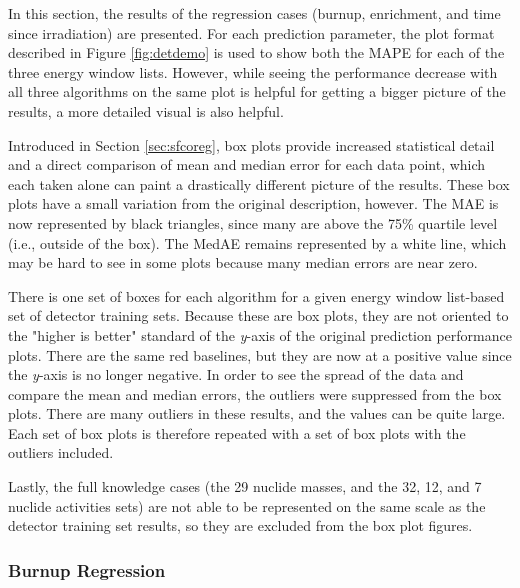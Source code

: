
In this section, the results of the regression cases (burnup, enrichment, and
time since irradiation) are presented. For each prediction parameter, the plot
format described in Figure \ref{fig:detdemo} is used to show both the
\gls{MAPE} for each of the three energy window lists.  However, while seeing
the performance decrease with all three algorithms on the same plot is helpful
for getting a bigger picture of the results, a more detailed visual is also
helpful. 

Introduced in Section \ref{sec:sfcoreg}, box plots provide increased
statistical detail and a direct comparison of mean and median error for each
data point, which each taken alone can paint a drastically different picture of
the results. These box plots have a small variation from the original
description, however.  The \gls{MAE} is now represented by black triangles,
since many are above the 75\% quartile level (i.e., outside of the box).  The
\gls{MedAE} remains represented by a white line, which may be hard to see in
some plots because many median errors are near zero.

There is one set of boxes for each algorithm for a given energy window
list-based set of detector training sets.  Because these are box plots, they
are not oriented to the "higher is better" standard of the \textit{y}-axis of
the original prediction performance plots.  There are the same red baselines,
but they are now at a positive value since the \textit{y}-axis is no longer
negative. In order to see the spread of the data and compare the mean and
median errors, the outliers were suppressed from the box plots. There are many
outliers in these results, and the values can be quite large. Each set of box
plots is therefore repeated with a set of box plots with the outliers included.

Lastly, the full knowledge cases (the 29 nuclide masses, and the 32, 12, and 7
nuclide activities sets) are not able to be represented on the same scale as
the detector training set results, so they are excluded from the box plot
figures. 

\subsubsection{Burnup Regression}

